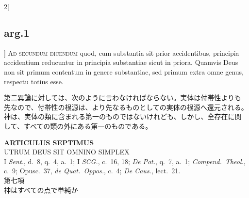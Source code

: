 \documentclass[paper=a4paper,fontsize=10pt,jafontsize=9pt,titlepage]{jlreq}
\begin{document}
\begin{paracol}{2}[\subsection{arg.1}]
{\scshape Ad secundum dicendum} quod, cum substantia sit prior accidentibus,
 principia accidentium reducuntur in principia substantiae sicut in
 priora. Quamvis Deus non sit primum contentum in genere substantiae,
 sed primum extra omne genus, respectu totius esse.

\switchcolumn

第二異論に対しては、次のように言わなければならない。実体は付帯性よりも
先なので、付帯性の根源は、より先なるものとしての実体の根源へ還元される。
神は、実体の類に含まれる第一のものではないけれども、しかし、全存在に関
して、すべての類の外にある第一のものである。

\end{paracol}

\newpage
{}
{}
\setcounter{section}{7}
\setcounter{subsection}{0}

\begin{center}
 {\Large {\bfseries ARTICULUS SEPTIMUS}}\\
 {\large UTRUM DEUS SIT OMNINO SIMPLEX}\\
 {\footnotesize I {\itshape Sent.}, d.~8, q.~4, a.~1; I {\itshape SCG.},
 c.~16, 18; {\itshape De Pot.}, q.~7, a.~1; {\itshape Compend.~Theol.},
 c.~9; Opusc.~37, {\itshape de Quat.~Oppos.}, c.~4; {\itshape De Caus.},
 lect.~21.}\\
 {\Large 第七項\\神はすべての点で単純か}
\end{center}
\end{document}
